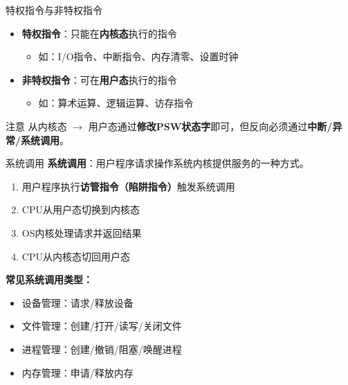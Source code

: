 \documentclass[10pt, aspectratio=169]{beamer}
\begin{document}
\begin{frame}{特权指令与非特权指令}
    \begin{itemize}
        \item \textbf{特权指令}：只能在\textbf{内核态}执行的指令
        \begin{itemize}
            \item 如：I/O指令、中断指令、内存清零、设置时钟
        \end{itemize}
        \item \textbf{非特权指令}：可在\textbf{用户态}执行的指令
        \begin{itemize}
            \item 如：算术运算、逻辑运算、访存指令
        \end{itemize}
    \end{itemize}
    \vspace{0.5em}
    \begin{block}{注意}
        从内核态 $\to$ 用户态通过\textbf{修改PSW状态字}即可，但反向必须通过\textbf{中断/异常/系统调用}。
    \end{block}
\end{frame}

\begin{frame}{系统调用}
    \textbf{系统调用}：用户程序请求操作系统内核提供服务的一种方式。

    \vspace{0.5em}
    \begin{enumerate}
        \item 用户程序执行\textbf{访管指令（陷阱指令）}触发系统调用
        \item CPU从用户态切换到内核态
        \item OS内核处理请求并返回结果
        \item CPU从内核态切回用户态
    \end{enumerate}
    \vspace{0.5em}
    \textbf{常见系统调用类型：}
    \begin{itemize}
        \item 设备管理：请求/释放设备
        \item 文件管理：创建/打开/读写/关闭文件
        \item 进程管理：创建/撤销/阻塞/唤醒进程
        \item 内存管理：申请/释放内存
    \end{itemize}
\end{frame}
\end{document}
